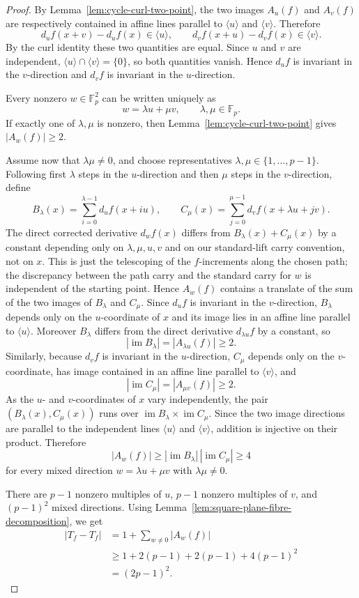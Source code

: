 \documentclass[reqno]{amsart}
\numberwithin{equation}{section}
\theoremstyle{definition}
\begin{document}
\begin{proof}
By Lemma~\ref{lem:cycle-curl-two-point}, the two images $A_u(f)$ and $A_v(f)$
are respectively contained in affine lines parallel to $\langle u\rangle$ and
$\langle v\rangle$.  Therefore
\[
  d_u f(x+v)-d_u f(x)\in\langle u\rangle,
  \qquad
  d_v f(x+u)-d_v f(x)\in\langle v\rangle.
\]
By the curl identity these two quantities are equal.  Since $u$ and $v$ are
independent, $\langle u\rangle\cap\langle v\rangle=\{0\}$, so both quantities
vanish.  Hence $d_u f$ is invariant in the $v$-direction and $d_v f$ is
invariant in the $u$-direction.

Every nonzero $w\in\mathbb F_p^2$ can be written uniquely as
\[
  w=\lambda u+\mu v,
  \qquad \lambda,\mu\in\mathbb F_p.
\]
If exactly one of $\lambda,\mu$ is nonzero, then
Lemma~\ref{lem:cycle-curl-two-point} gives $|A_w(f)|\geq 2$.

Assume now that $\lambda\mu\neq 0$, and choose representatives
$\lambda,\mu\in\{1,\ldots,p-1\}$.  Following first $\lambda$ steps in the
$u$-direction and then $\mu$ steps in the $v$-direction, define
\[
  B_\lambda(x)=\sum_{i=0}^{\lambda-1}d_u f(x+iu),
  \qquad
  C_\mu(x)=\sum_{j=0}^{\mu-1}d_v f(x+\lambda u+jv).
\]
The direct corrected derivative $d_w f(x)$ differs from
$B_\lambda(x)+C_\mu(x)$ by a constant depending only on $\lambda,\mu,u,v$ and on
our standard-lift carry convention, not on $x$.  This is just the telescoping of
the \(f\)-increments along the chosen path; the discrepancy between the path
carry and the standard carry for \(w\) is independent of the starting point.
Hence $A_w(f)$ contains a translate of the sum of the two images of $B_\lambda$
and $C_\mu$.
Since $d_u f$ is invariant in the $v$-direction, $B_\lambda$ depends only on the
$u$-coordinate of $x$ and its image lies in an affine line parallel to
$\langle u\rangle$.  Moreover $B_\lambda$ differs from the direct derivative
$d_{\lambda u}f$ by a constant, so
\[
  |\operatorname{im} B_\lambda|=|A_{\lambda u}(f)|\geq 2.
\]
Similarly, because $d_v f$ is invariant in the $u$-direction, $C_\mu$ depends
only on the $v$-coordinate, has image contained in an affine line parallel to
$\langle v\rangle$, and
\[
  |\operatorname{im} C_\mu|=|A_{\mu v}(f)|\geq 2.
\]
As the \(u\)- and \(v\)-coordinates of \(x\) vary independently, the pair
\((B_\lambda(x),C_\mu(x))\) runs over
\(\operatorname{im}B_\lambda\times\operatorname{im}C_\mu\).
Since the two image directions are parallel to the independent lines
$\langle u\rangle$ and $\langle v\rangle$, addition is injective on their
product.  Therefore
\[
  |A_w(f)|\geq
  |\operatorname{im} B_\lambda|\,|\operatorname{im} C_\mu|
  \geq 4
\]
for every mixed direction $w=\lambda u+\mu v$ with $\lambda\mu\neq 0$.

There are $p-1$ nonzero multiples of $u$, $p-1$ nonzero multiples of $v$, and
$(p-1)^2$ mixed directions.  Using Lemma~\ref{lem:square-plane-fibre-decomposition},
we get
\[
\begin{aligned}
  |T_f-T_f|
  &=1+\sum_{w\neq 0}|A_w(f)| \\
  &\geq 1+2(p-1)+2(p-1)+4(p-1)^2 \\
  &=(2p-1)^2.
\end{aligned}
\]
\end{proof}
\end{document}
